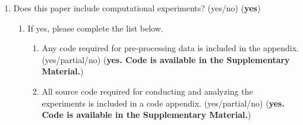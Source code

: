 \begin{enumerate}
\begin{enumerate}
\begin{enumerate}
            \item If yes, please complete the list below.
            \begin{enumerate}
                \item A motivation is given for why the experiments are conducted on the selected datasets (yes/partial/no/NA) (\textbf{yes})
                \item All novel datasets introduced in this paper are included in a data appendix. (yes/partial/no/NA) (\textbf{NA})
                \item All novel datasets introduced in this paper will be made publicly available upon publication of the paper with a license that allows free usage for research purposes. (yes/partial/no/NA) (\textbf{yes})
                \item All datasets drawn from the existing literature (potentially including authors’ own previously published work) are accompanied by appropriate citations. (yes/no/NA) (\textbf{yes})
                \item All datasets drawn from the existing literature (potentially including authors’ own previously published work) are publicly available. (yes/partial/no/NA) (\textbf{yes})
                \item All datasets that are not publicly available are described in detail, with explanation why publicly available alternatives are not scientifically satisficing. (yes/partial/no/NA) (\textbf{NA})
            \end{enumerate}
        \end{enumerate}
        \item Does this paper include computational experiments? (yes/no) (\textbf{yes})
        \begin{enumerate}
            \item If yes, please complete the list below.
            \begin{enumerate}
                \item Any code required for pre-processing data is included in the appendix. (yes/partial/no) 
                (\textbf{yes. Code is available in the Supplementary Material.})
                \item All source code required for conducting and analyzing the experiments is included in a code appendix. (yes/partial/no) 
                (\textbf{yes. Code is available in the Supplementary Material.})

\end{enumerate}
\end{enumerate}
\end{enumerate}
\end{enumerate}
